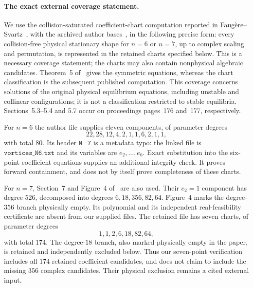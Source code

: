 \paragraph{The exact external coverage statement.}
We use the collision-saturated coefficient-chart computation reported in
Faug\`ere--Svartz~\cite[Sections~5.3--5.7]{FS}, with the archived
author bases~\cite{FSdata,FSdataSeven}, in the following precise form:
every collision-free physical stationary shape for $n=6$ or $n=7$,
up to complex scaling and permutation, is represented in the retained
charts specified below. This is a necessary coverage statement; the
charts may also contain nonphysical algebraic candidates. Theorem~5
of~\cite{FS} gives the symmetric equations, whereas the chart
classification is the subsequent published computation.
This coverage concerns solutions of the original physical equilibrium
equations, including unstable and collinear configurations; it is not a
classification restricted to stable equilibria. Sections~5.3--5.4 and
5.7 occur on proceedings pages~176 and~177, respectively.

For $n=6$ the author file supplies eleven components, of parameter
degrees
\[
 22,28,12,4,2,1,1,6,2,1,1,
\]
with total $80$. Its header $\texttt{N=7}$ is a metadata typo: the
linked file is $\texttt{vortices\_N6.txt}$ and its variables are
$e_2,\ldots,e_6$. Exact substitution into the six-point coefficient
equations supplies an additional integrity check. It proves forward
containment, and does not by itself prove completeness of these charts.

For $n=7$, Section~7 and Figure~4 of~\cite[p.~178]{FS} are also used. Their
$e_2=1$ component has degree $526$, decomposed into degrees
$6,18,356,82,64$. Figure~4 marks the degree-$356$ branch physically
empty. Its polynomial and its independent real-feasibility certificate
are absent from our supplied files. The retained file has seven charts,
of parameter degrees
\[
 1,1,2,6,18,82,64,
\]
with total $174$. The degree-$18$ branch, also marked physically
empty in the paper, is retained and independently excluded below.
Thus our seven-point verification includes all $174$ retained
coefficient candidates, and does not claim to include the missing
$356$ complex candidates. Their physical exclusion remains a cited
external input.

